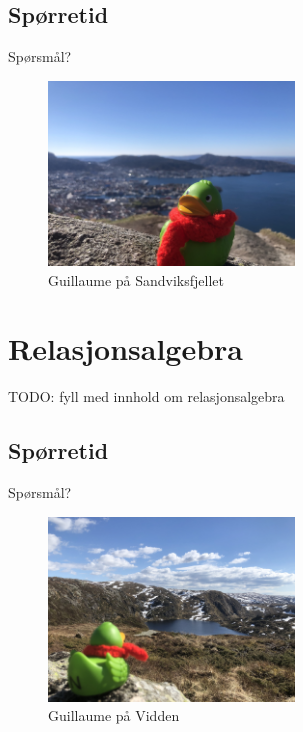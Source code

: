 \subsection*{Spørretid}
\begin{frame}{Spørsmål?}
    \begin{figure}
        \centering
        \includegraphics[height = 4.9cm]{images/guillaume1.jpg}
        \caption{Guillaume på Sandviksfjellet}
        \label{fig:guillaume1}
    \end{figure}
\end{frame}

\section{Relasjonsalgebra}
\begin{frame}{}
    TODO: fyll med innhold om relasjonsalgebra
\end{frame}

\subsection*{Spørretid}
\begin{frame}{Spørsmål?}
    \begin{figure}
        \centering
        \includegraphics[height = 4.9cm]{images/guillaume4.jpg}
        \caption{Guillaume på Vidden}
        \label{fig:guillaume4}
    \end{figure}
\end{frame}

